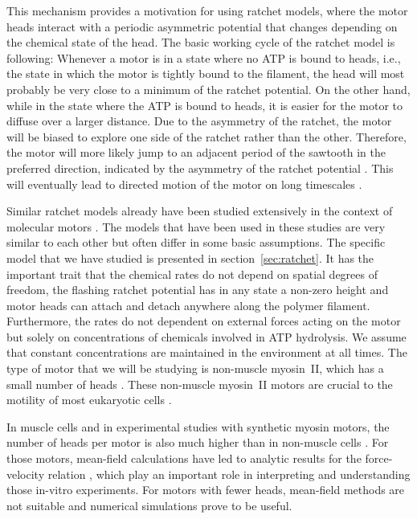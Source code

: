 \documentclass[aps,pre,twocolumn,showpacs,showkeys,superscriptaddress,floatfix]{revtex4-1}
\begin{document}
This mechanism provides a motivation for using ratchet models, 
where the motor heads interact with a periodic asymmetric potential that changes depending on the chemical state of the head. 
The basic working cycle of the ratchet model is following:
Whenever a motor is in a state where no ATP is bound to heads, i.e., the state in which the motor is tightly bound to the filament, 
the head will most probably be very close to a minimum of the ratchet potential. 
On the other hand, while in the state where the ATP is bound to heads, it is easier for the motor to diffuse over a larger distance. 
Due to the asymmetry of the ratchet, the motor will be biased to explore one side of the ratchet rather than the other. 
Therefore, the motor will more likely jump to an adjacent period of the sawtooth in the preferred direction, indicated by the asymmetry of the ratchet potential \cite{reimann2002brownian}.
This will eventually lead to directed motion of the motor on long timescales \cite{hoffmann2016molecular,Reimann2002introduction,de2007symmetries}. 

Similar ratchet models already have been studied extensively in the context of molecular motors \cite{reimann2002brownian,astumian1994fluctuation,astumian1996mechanochemical,julicher1997modeling,Reimann2002introduction,julicher1997spontaneous,peskin1995correlation,huxley1969mechanism,huxley1971proposed}.
The models that have been used in these studies are very similar to each other but often differ in some basic assumptions.
The specific model that we have studied is presented in section~\ref{sec:ratchet}. 
It has the important trait that the chemical rates do not depend on spatial degrees of freedom, 
the flashing ratchet potential has in any state a non-zero height 
and motor heads can attach and detach anywhere along the polymer filament.
Furthermore, the rates do not dependent on external forces acting on the motor but solely on concentrations of chemicals involved in ATP hydrolysis. 
We assume that constant concentrations are maintained in the environment at all times. 
The type of motor that we will be studying is non-muscle myosin~II, which has a small number of heads \cite{pollard1982structure}. 
These non-muscle myosin~II motors are crucial to the motility of most eukaryotic cells \cite{vicente2009non}.

In muscle cells and in experimental studies with synthetic myosin motors, 
the number of heads per motor is also much higher than in non-muscle cells \cite{brown2009cross-correlated}.
For those motors, mean-field calculations have led to analytic results for the force-velocity relation \cite{julicher1997modeling},
which play an important role in interpreting and understanding those in-vitro experiments.
For motors with fewer heads, mean-field methods are not suitable and numerical simulations prove to be useful.
\end{document}
